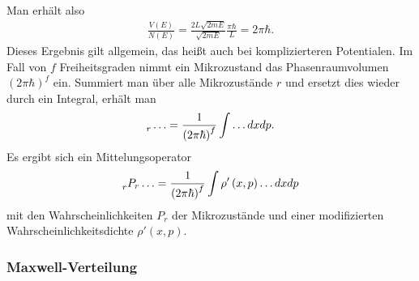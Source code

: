 \documentclass{book}
\let\sum\relax
\DeclareMathOperator*{\sum}{\raisebox{-3.5pt}{\scalebox{2}{\rotatebox{1}{{\bask Σ}}}}}
\begin{document}
%
Man erhält also
%
\begin{eqnarray}
\frac{V\left(E\right)}{N\left(E\right)} = \frac{2L\sqrt{2mE}}{\sqrt{2mE}}\frac{\pi\hbar}{L} = 2\pi\hbar.
\end{eqnarray}
%
Dieses Ergebnis gilt allgemein, das heißt auch bei komplizierteren Potentialen. Im Fall von $f$ Freiheitsgraden nimmt ein Mikrozustand das Phasenraumvolumen $\left(2\pi\hbar\right)^f$ ein. Summiert man über alle Mikrozustände $r$ und ersetzt dies wieder durch ein Integral, erhält man
%
\begin{eqnarray}
\sum_{r}^{}\dotsc = \frac{1}{\left(2\pi\hbar\right)^f}\int\dotsc dxdp.
\end{eqnarray}
%
Es ergibt sich ein Mittelungsoperator
%
\begin{eqnarray}
\sum_{r}^{}P_r\dotsc = \frac{1}{\left(2\pi\hbar\right)^f}\int\rho'\left(x, p\right)\dotsc dxdp\label{eq:mittelungsoperator_klassisch}
\end{eqnarray}
%
mit den Wahrscheinlichkeiten $P_r$ der Mikrozustände und einer modifizierten Wahrscheinlichkeitsdichte $\rho'\left(x, p\right)$.

\subsubsection{Maxwell-Verteilung}
\label{sec:maxwellverteilung}
\end{document}
